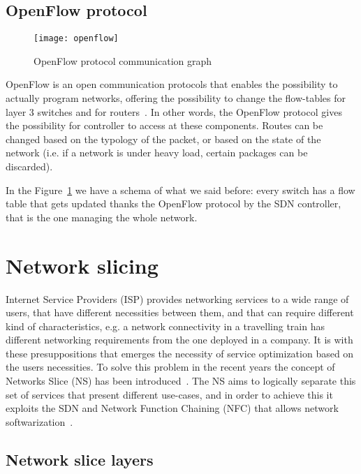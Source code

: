 \subsection{OpenFlow protocol}

\begin{figure}[h]
 \centering
 \texttt{[image: openflow]}
 \caption{OpenFlow protocol communication graph}
 \label{chap:background:img:openflow_protocol}
\end{figure}

OpenFlow is an open communication protocols that enables the possibility to
actually program networks, offering the possibility to change the flow-tables
for layer 3 switches and for routers~\cite{mckeown2008openflow}. In other words,
the OpenFlow protocol gives the possibility for controller to access at these
components. Routes can be changed based on the typology of the packet, or based
on the state of the network (i.e. if a network is under heavy load, certain
packages can be discarded).

In the Figure~\ref{chap:background:img:openflow_protocol} we have a schema of
what we said before: every switch has a flow table that gets updated thanks the
OpenFlow protocol by the SDN controller, that is the one managing the whole
network.

\section{Network slicing}
Internet Service Providers (ISP) provides networking services to a wide range of
users, that have different necessities between them, and that can require
different kind of characteristics, e.g. a network connectivity in a travelling
train has different networking requirements from the one deployed in a company.
It is with these presuppositions that emerges the necessity of service
optimization based on the users necessities. To solve this problem in the recent
years the concept of Networks Slice (NS) has been
introduced~\cite{alliance20155g}. The NS aims to logically separate this set of
services that present different use-cases, and in order to achieve this it
exploits the SDN and Network Function Chaining (NFC) that allows network
softwarization~\cite{ordonez2017network}.

\subsection{Network slice layers}

